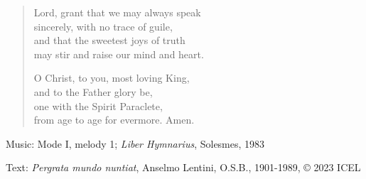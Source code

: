 \hymn



\setlength{\vleftmargin}{2em}
\begin{verse}
Lord, grant that we may always speak\\
sincerely, with no trace of guile,\\
and that the sweetest joys of truth\\
may stir and raise our mind and heart.

O Christ, to you, most loving King,\\
and to the Father glory be,\\
one with the Spirit Paraclete,\\
from age to age for evermore. Amen.
\end{verse}
\setlength{\vleftmargin}{\defleftmargini}

\begin{hymnsource}
Music: Mode I, melody 1; \emph{Liber Hymnarius}, Solesmes, 1983

Text: \emph{Pergrata mundo nuntiat}, Anselmo Lentini, O.S.B., 1901-1989, © 2023 ICEL
\end{hymnsource}

